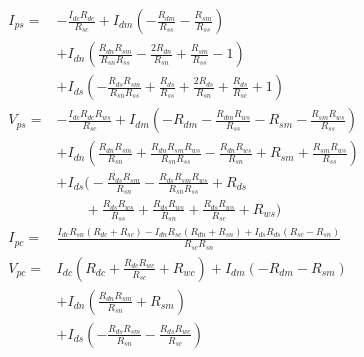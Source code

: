 \begin{align*}
    I_{ps} =& - \frac{I_{dc} R_{dc}}{R_{sc}} + I_{dm} \left(- \frac{R_{dm}}{R_{ss}} - \frac{R_{sm}}{R_{ss}}\right) \\
    &+ I_{dn} \left(\frac{R_{dn} R_{sm}}{R_{sn} R_{ss}} - \frac{2 R_{dn}}{R_{sn}} + \frac{R_{sm}}{R_{ss}} - 1\right) \\
    &+ I_{ds} \left(- \frac{R_{ds} R_{sm}}{R_{sn} R_{ss}} + \frac{R_{ds}}{R_{ss}} + \frac{2 R_{ds}}{R_{sn}} + \frac{R_{ds}}{R_{sc}} + 1\right) \\
    V_{ps} =& - \frac{I_{dc} R_{dc} R_{ws}}{R_{sc}} + I_{dm} \left(- R_{dm} - \frac{R_{dm} R_{ws}}{R_{ss}} - R_{sm} - \frac{R_{sm} R_{ws}}{R_{ss}}\right) \\
    &+ I_{dn} \left(\frac{R_{dn} R_{sm}}{R_{sn}} + \frac{R_{dn} R_{sm} R_{ws}}{R_{sn} R_{ss}} - \frac{R_{dn} R_{ws}}{R_{sn}} + R_{sm} + \frac{R_{sm} R_{ws}}{R_{ss}}\right) \\
    &+ I_{ds} \bigg(- \frac{R_{ds} R_{sm}}{R_{sn}} - \frac{R_{ds} R_{sm} R_{ws}}{R_{sn} R_{ss}} + R_{ds} \\
    &\qquad+ \frac{R_{ds} R_{ws}}{R_{ss}} + \frac{R_{ds} R_{ws}}{R_{sn}} + \frac{R_{ds} R_{ws}}{R_{sc}} + R_{ws}\bigg) \\
    I_{pc} =& \frac{I_{dc} R_{sn} \left(R_{dc} + R_{sc}\right) - I_{dn} R_{sc} \left(R_{dn} + R_{sn}\right) + I_{ds} R_{ds} \left(R_{sc} - R_{sn}\right)}{R_{sc} R_{sn}} \\
    V_{pc} =& I_{dc} \left(R_{dc} + \frac{R_{dc} R_{wc}}{R_{sc}} + R_{wc}\right) + I_{dm} \left(- R_{dm} - R_{sm}\right) \\
    &+ I_{dn} \left(\frac{R_{dn} R_{sm}}{R_{sn}} + R_{sm}\right) \\
    &+ I_{ds} \left(- \frac{R_{ds} R_{sm}}{R_{sn}} - \frac{R_{ds} R_{wc}}{R_{sc}}\right)
\end{align*}

